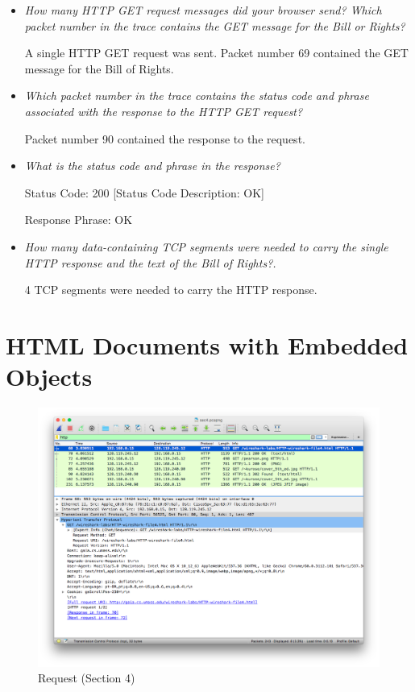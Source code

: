 \documentclass[11pt]{article}
\begin{document}
\pagebreak

\begin{itemize}
	\setlength\itemsep{.5cm}

	\item
		\textit{How many HTTP GET request messages did your browser send? Which packet number
in the trace contains the GET message for the Bill or Rights?}
		\par A single HTTP GET request was sent. Packet number 69 contained the GET message for the Bill of Rights.
		
	\item
		\textit{Which packet number in the trace contains the status code and phrase associated with
the response to the HTTP GET request?}
		\par Packet number 90 contained the response to the request.
		
	\item
		\textit{What is the status code and phrase in the response?}
		\par Status Code: 200 [Status Code Description: OK]
		\par Response Phrase: OK

	\item
		\textit{How many data-containing TCP segments were needed to carry the single HTTP
response and the text of the Bill of Rights?.}
		\par 4 TCP segments were needed to carry the HTTP response.
		

\end{itemize}

\section{HTML Documents with Embedded Objects}

\begin{figure}[H]
\centering
\caption{Request (Section 4)}
\includegraphics[width=\textwidth]{04-request}
\end{figure}
\end{document}
